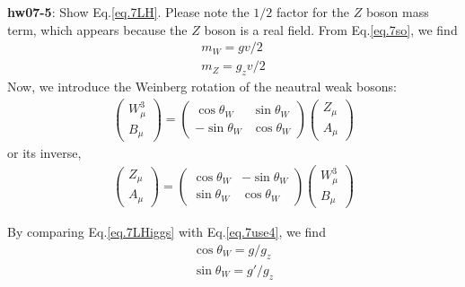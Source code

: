 \documentclass[12pt]{article}
\begin{document}
{\bf hw07-5}: Show Eq.\ref{eq.7LH}.
  Please note the $1/2$ factor for the $Z$ boson mass term, which
  appears because the $Z$ boson is a real field. From Eq.\ref{eq.7so}, we find
\begin{eqnarray}
  m_W = g v/2 \\
  m_Z = g_z v/2
\end{eqnarray}
  Now, we introduce the Weinberg rotation of the neautral weak
  bosons:
\begin{eqnarray}
  \begin{pmatrix}
    W^3_\mu \\  B_\mu
  \end{pmatrix}
  =
  \begin{pmatrix}
    \cos\theta_W & \sin\theta_W \\
    -\sin\theta_W & \cos\theta_W
  \end{pmatrix}
  \begin{pmatrix}
    Z_\mu \\ A_\mu
  \end{pmatrix}
\end{eqnarray}
 or its inverse,
 \begin{eqnarray}
  \begin{pmatrix}
    Z_\mu \\  A_\mu
  \end{pmatrix}
  =
  \begin{pmatrix}
    \cos\theta_W & -\sin\theta_W \\
    \sin\theta_W & \cos\theta_W
  \end{pmatrix}
  \begin{pmatrix}
    W^3_\mu \\ B_\mu
  \end{pmatrix}
\end{eqnarray}

  By comparing Eq.\ref{eq.7LHiggs} with Eq.\ref{eq.7use4}, we find
\begin{eqnarray}
  \cos\theta_W =  g/g_z\\
  \sin\theta_W = g'/g_z
\end{eqnarray}
\end{document}
